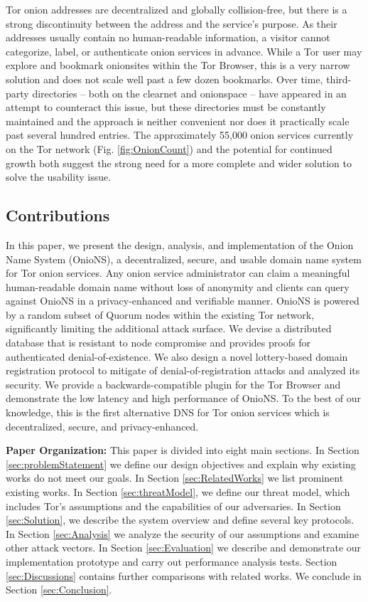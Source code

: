 \documentclass[USenglish,oneside,twocolumn]{article}
\begin{document}
Tor onion addresses are decentralized and globally collision-free, but there is a strong discontinuity between the address and the service's purpose. As their addresses usually contain no human-readable information, a visitor cannot categorize, label, or authenticate onion services in advance. While a Tor user may explore and bookmark onionsites within the Tor Browser, this is a very narrow solution and does not scale well past a few dozen bookmarks. Over time, third-party directories -- both on the clearnet and onionspace -- have appeared in an attempt to counteract this issue, but these directories must be constantly maintained and the approach is neither convenient nor does it practically scale past several hundred entries. The approximately 55,000 onion services currently on the Tor network (Fig. \ref{fig:OnionCount}) and the potential for continued growth both suggest the strong need for a more complete and wider solution to solve the usability issue.

\subsection{Contributions}

In this paper, we present the design, analysis, and implementation of the Onion Name System  (OnioNS), a decentralized, secure, and usable domain name system for Tor onion services. Any onion service administrator can claim a meaningful human-readable domain name without loss of anonymity and clients can query against OnioNS in a privacy-enhanced and verifiable manner. OnioNS is powered by a random subset of Quorum nodes within the existing Tor network, significantly limiting the additional attack surface. We devise a distributed database that is resistant to node compromise and provides proofs for authenticated denial-of-existence. We also design a novel lottery-based domain registration protocol to mitigate of denial-of-registration attacks and analyzed its security. We provide a backwards-compatible plugin for the Tor Browser and demonstrate the low latency and high performance of OnioNS. To the best of our knowledge, this is the first alternative DNS for Tor onion services which is decentralized, secure, and privacy-enhanced. %

\textbf{Paper Organization:} This paper is divided into eight main sections. In Section \ref{sec:problemStatement} we define our design objectives and explain why existing works do not meet our goals. In Section \ref{sec:RelatedWorks} we list prominent existing works. In Section \ref{sec:threatModel}, we define our threat model, which includes Tor's assumptions and the capabilities of our adversaries. In Section \ref{sec:Solution}, we describe the system overview and define several key protocols. In Section \ref{sec:Analysis} we analyze the security of our assumptions and examine other attack vectors. In Section \ref{sec:Evaluation} we describe and demonstrate our implementation prototype and carry out performance analysis tests. Section \ref{sec:Discussions} contains further comparisons with related works. We conclude in Section \ref{sec:Conclusion}.
\end{document}
